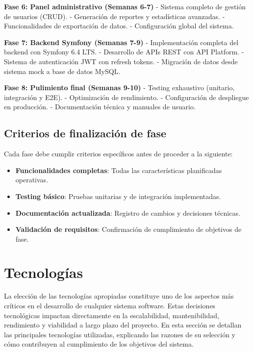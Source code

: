 \documentclass[12pt,a4paper,oneside]{report}
\providecommand{\tightlist}{%
  \setlength{\itemsep}{0pt}\setlength{\parskip}{0pt}}
\begin{document}
\textbf{Fase 6: Panel administrativo (Semanas 6-7)} - Sistema completo
de gestión de usuarios (CRUD). - Generación de reportes y estadísticas
avanzadas. - Funcionalidades de exportación de datos. - Configuración
global del sistema.

\textbf{Fase 7: Backend Symfony (Semanas 7-9)} - Implementación completa
del backend con Symfony 6.4 LTS. - Desarrollo de APIs REST con API
Platform. - Sistema de autenticación JWT con refresh tokens. - Migración
de datos desde sistema mock a base de datos MySQL.

\textbf{Fase 8: Pulimiento final (Semanas 9-10)} - Testing exhaustivo
(unitario, integración y E2E). - Optimización de rendimiento. -
Configuración de despliegue en producción. - Documentación técnica y
manuales de usuario.

\subsection{Criterios de finalización de
fase}\label{criterios-de-finalizaciuxf3n-de-fase}

Cada fase debe cumplir criterios específicos antes de proceder a la
siguiente:

\begin{itemize}
\tightlist
\item
  \textbf{Funcionalidades completas}: Todas las características
  planificadas operativas.
\item
  \textbf{Testing básico}: Pruebas unitarias y de integración
  implementadas.
\item
  \textbf{Documentación actualizada}: Registro de cambios y decisiones
  técnicas.
\item
  \textbf{Validación de requisitos}: Confirmación de cumplimiento de
  objetivos de fase.
\end{itemize}

\section{Tecnologías}\label{tecnologuxedas}

La elección de las tecnologías apropiadas constituye uno de los aspectos
más críticos en el desarrollo de cualquier sistema software. Estas
decisiones tecnológicas impactan directamente en la escalabilidad,
mantenibilidad, rendimiento y viabilidad a largo plazo del proyecto. En
esta sección se detallan las principales tecnologías utilizadas,
explicando las razones de su selección y cómo contribuyen al
cumplimiento de los objetivos del sistema.
\end{document}
